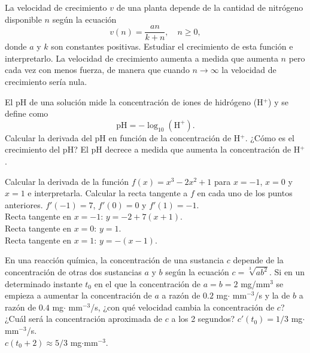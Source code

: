 {La velocidad de crecimiento $v$ de una planta depende de la cantidad de nitrógeno disponible $n$ según la ecuación
\[
v(n) = \frac{an}{k+n},	\quad n\geq 0,
\]
donde $a$ y $k$ son constantes positivas.
Estudiar el crecimiento de esta función e interpretarlo.
}
{La velocidad de crecimiento aumenta a medida que aumenta $n$ pero cada vez con menos fuerza, de manera que cuando $n\rightarrow \infty$ la
velocidad de crecimiento sería nula. }
{
}


{El pH de una solución mide la concentración de iones de hidrógeno (H$^+$) y se define como
\[
\mbox{pH} = -\log_{10}(\mbox{H}^+).
\]
Calcular la derivada del pH en función de la concentración de H$^+$.
¿Cómo es el crecimiento del pH?
}
{El pH decrece a medida que aumenta la concentración de H$^+$.
}
{
}


{Calcular la derivada de la función $f(x)=x^3-2x^2+1$ para $x=-1$, $x=0$ y $x=1$ e interpretarla.
Calcular la recta tangente a $f$ en cada uno de los puntos anteriores.
}
{$f'(-1)=7$, $f'(0)=0$ y $f'(1)=-1$.\\
Recta tangente en $x=-1$: $y=-2+7(x+1)$.\\
Recta tangente en $x=0$: $y=1$.\\
Recta tangente en $x=1$: $y=-(x-1)$.
}
{
}

{
En una reacción química, la concentración de una sustancia $c$ depende de la concentración de otras dos sustancias $a$ y $b$
según la ecuación $c=\sqrt[3]{ab^2}$.
Si en un determinado instante $t_0$ en el que la concentración de $a=b=2$ mg/mm$^3$ se empieza a aumentar la concentración de $a$ a razón de $0.2$ mg$\cdot$ mm$^{-3}$/s y la de $b$ a razón de $0.4$ mg$\cdot$ mm$^{-3}$/s, ¿con qué velocidad cambia la concentración de $c$?
¿Cuál será la concentración aproximada de $c$ a los 2 segundos?
}
{$c'(t_0)=1/3$ mg$\cdot$mm$^{-3}$/s.\\
$c(t_0+2)\approx 5/3$  mg$\cdot$mm$^{-3}$.
}
{
}
